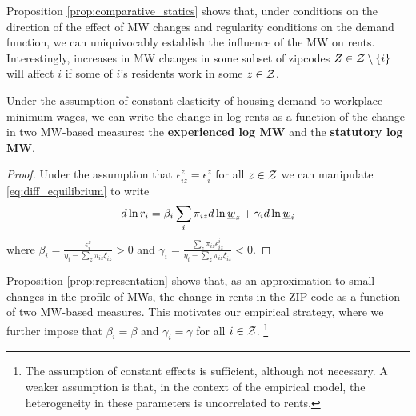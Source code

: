 Proposition \ref{prop:comparative_statics} shows that, under conditions on the 
direction of the effect of MW changes and regularity conditions on the demand 
function, we can uniquivocably establish the influence of the MW on rents. 
Interestingly, increases in MW changes in some subset of zipcodes $Z\in\mathcal{Z}\setminus\{i\}$ 
will affect $i$ if some of $i$'s residents work in some $z\in\mathcal{Z}$.

\begin{prop}[Representation]\label{prop:representation}
    Under the assumption of constant elasticity of housing demand to workplace minimum 
    wages, we can write the change in log rents as a function of the change in two 
    MW-based measures: the \textbf{experienced log MW} and the \textbf{statutory 
    log MW}.
\end{prop}

\begin{proof}
    Under the assumption that $\epsilon_{iz}^z = \epsilon_i^z$ for all $z\in\mathcal{Z}$ we can 
    manipulate \eqref{eq:diff_equilibrium} to write
    $$
    d \ln r_i = \beta_i \sum_i \pi_{iz} d\ln \underline{w}_z + \gamma_i d \ln \underline{w}_i
    $$
    where $\beta_i = \frac{\epsilon_{i}^z}{\eta_{i} - \sum_z \pi_{iz} \xi_{iz}} 
    >0$ and $\gamma_i = \frac{\sum_z \pi_{iz} \epsilon_{iz}^i}{\eta_{i} 
            - \sum_z \pi_{iz} \xi_{iz}} < 0$.
\end{proof}

Proposition \ref{prop:representation} shows that, as an approximation to small changes in 
the profile of MWs, the change in rents in the ZIP code as a function of two MW-based 
measures.
This motivates our empirical strategy, where we further impose that $\beta_i = \beta$ and 
$\gamma_i=\gamma$ for all $i\in\mathcal{Z}$.%
\footnote{The assumption of constant effects is sufficient, although not necessary. A 
weaker assumption is that, in the context of the empirical model, the heterogeneity in 
these parameters is uncorrelated to rents.}

